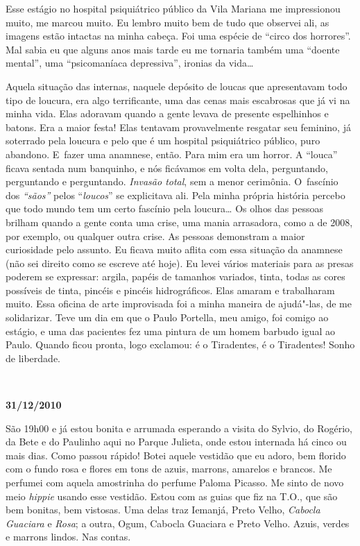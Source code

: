 Esse estágio no hospital psiquiátrico público da Vila Mariana me
impressionou muito, me marcou muito. Eu lembro muito bem de tudo que
observei ali, as imagens estão intactas na minha cabeça. Foi uma espécie
de ``circo dos horrores''. Mal sabia eu que alguns anos mais tarde eu me
tornaria também uma ``doente mental'', uma ``psicomaníaca depressiva'',
ironias da vida…

Aquela situação das internas, naquele depósito de loucas que
apresentavam todo tipo de loucura, era algo terrificante, uma das cenas
mais escabrosas que já vi na minha vida. Elas adoravam quando a gente
levava de presente espelhinhos e batons. Era a maior festa! Elas
tentavam provavelmente resgatar seu feminino, já soterrado pela loucura
e pelo que é um hospital psiquiátrico público, puro abandono. E~fazer
uma anamnese, então. Para mim era um horror. A ``louca'' ficava
sentada num banquinho, e nós ficávamos em volta dela, perguntando,
perguntando e perguntando. \emph{Invasão total}, sem a menor cerimônia.
O~fascínio dos \emph{``sãos''} pelos ``\emph{loucos}'' se explicitava
ali. Pela minha própria história percebo que todo mundo tem um certo
fascínio pela loucura… Os olhos das pessoas brilham quando a
gente conta uma crise, uma mania arrasadora, como a de 2008, por
exemplo, ou qualquer outra crise. As pessoas demonstram a maior
curiosidade pelo assunto. Eu ficava muito aflita com essa situação da
anamnese (não sei direito como se escreve até hoje). Eu levei
vários materiais para as presas poderem se expressar: argila, papéis de
tamanhos variados, tinta, todas as cores possíveis de tinta, pincéis e
pincéis hidrográficos. Elas amaram e trabalharam muito. Essa oficina de
arte improvisada foi a minha maneira de ajudá"-las, de me solidarizar.
Teve um dia em que o Paulo Portella, meu amigo, foi comigo ao estágio, e
uma das pacientes fez uma pintura de um homem barbudo igual ao Paulo.
Quando ficou pronta, logo exclamou: é o Tiradentes, é o Tiradentes!
Sonho de liberdade.

\begin{center}\asterisc{}​\end{center}


\begin{flushright}\textbf{31/12/2010}\end{flushright}


São 19h00 e já estou bonita e arrumada esperando a visita do Sylvio, do
Rogério, da Bete e do Paulinho aqui no Parque Julieta, onde estou
internada há cinco ou mais dias. Como passou rápido! Botei aquele
vestidão que eu adoro, bem florido com o fundo rosa e flores em tons de
azuis, marrons, amarelos e brancos. Me perfumei com aquela amostrinha do
perfume Paloma Picasso. Me sinto de novo meio \emph{hippie} usando esse
vestidão. Estou com as guias que fiz na T.O., que são bem bonitas, bem
vistosas. Uma delas traz Iemanjá, Preto Velho, \emph{Cabocla Guaciara} e
\emph{Rosa}; a outra, Ogum, Cabocla Guaciara e Preto Velho. Azuis,
verdes e marrons lindos. Nas contas.

